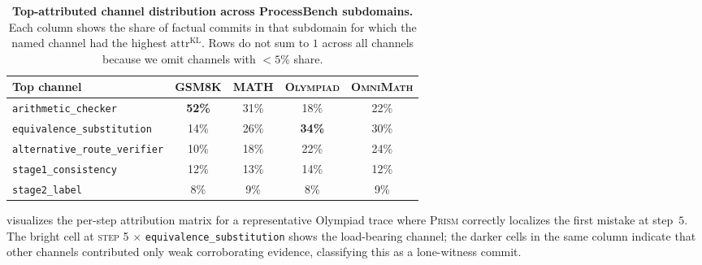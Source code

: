 \documentclass[11pt,a4paper]{article}
\newcommand{\KL}{\mathrm{KL}}
\theoremstyle{plain}
\theoremstyle{definition}
\theoremstyle{remark}
\begin{document}
\begin{table}[t]
\centering
\caption{\textbf{Top-attributed channel distribution across
ProcessBench subdomains.} Each column shows the share of factual
commits in that subdomain for which the named channel had the
highest $\mathrm{attr}^{\KL}$. Rows do not sum to $1$ across all
channels because we omit channels with $<\!5\%$ share.}
\label{tab:attr}
\small
\begin{tabular}{lcccc}
\toprule
Top channel & \textsc{GSM8K} & \textsc{MATH} & \textsc{Olympiad} &
  \textsc{OmniMath} \\
\midrule
\texttt{arithmetic\_checker}            & \textbf{52\%} & 31\% & 18\% & 22\% \\
\texttt{equivalence\_substitution}      & 14\% & 26\% & \textbf{34\%} & 30\% \\
\texttt{alternative\_route\_verifier}   & 10\% & 18\% & 22\% & 24\% \\
\texttt{stage1\_consistency}            & 12\% & 13\% & 14\% & 12\% \\
\texttt{stage2\_label}                  & 8\% & 9\% & 8\% & 9\% \\
\bottomrule
\end{tabular}
\end{table}

 visualizes the per-step attribution
matrix for a representative Olympiad trace where \textsc{Prism}
correctly localizes the first mistake at step~$5$. The bright cell
at \textsc{step 5} $\times$ \texttt{equivalence\_substitution} shows
the load-bearing channel; the darker cells in the same column
indicate that other channels contributed only weak corroborating
evidence, classifying this as a lone-witness commit.
\end{document}
